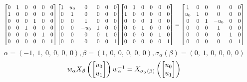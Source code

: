 \documentclass[11pt]{article}
\theoremstyle{definition}
\begin{document}
\[
\scaletoalign{\textwidth}{{\left[\begin{matrix}0 & 1 & 0 & 0 & 0 & 0\\1 & 0 & 0 & 0 & 0 & 0\\0 & 0 & 0 & 1 & 0 & 0\\0 & 0 & 1 & 0 & 0 & 0\\0 & 0 & 0 & 0 & 1 & 0\\0 & 0 & 0 & 0 & 0 & 1\end{matrix}\right]} {\left[\begin{matrix}1 & u_{0} & 0 & 0 & 0 & 0\\0 & 1 & 0 & 0 & 0 & 0\\0 & 0 & 1 & 0 & 0 & 0\\0 & 0 & - u_{0} & 1 & 0 & 0\\0 & 0 & 0 & 0 & 1 & 0\\0 & 0 & 0 & 0 & 0 & 1\end{matrix}\right]} {\left[\begin{matrix}0 & 1 & 0 & 0 & 0 & 0\\1 & 0 & 0 & 0 & 0 & 0\\0 & 0 & 0 & 1 & 0 & 0\\0 & 0 & 1 & 0 & 0 & 0\\0 & 0 & 0 & 0 & 1 & 0\\0 & 0 & 0 & 0 & 0 & 1\end{matrix}\right]} = {\left[\begin{matrix}1 & 0 & 0 & 0 & 0 & 0\\u_{0} & 1 & 0 & 0 & 0 & 0\\0 & 0 & 1 & - u_{0} & 0 & 0\\0 & 0 & 0 & 1 & 0 & 0\\0 & 0 & 0 & 0 & 1 & 0\\0 & 0 & 0 & 0 & 0 & 1\end{matrix}\right]}}
\]
\[
\alpha = \left( -1, \  1, \  0, \  0, \  0, \  0\right), \beta = \left( 1, \  0, \  0, \  0, \  0, \  0\right), \sigma_{\alpha}(\beta) = \left( 0, \  1, \  0, \  0, \  0, \  0\right)
\]
\[
\scaletoalign{\textwidth}{w_{\alpha} X_{\beta}\left(\left[\begin{matrix}u_{0}\\u_{1}\end{matrix}\right]\right) w_{\alpha}^{-1} = X_{\sigma_{\alpha}\left(\beta\right)}\left(\left[\begin{matrix}u_{0}\\u_{1}\end{matrix}\right]\right)}
\]
\end{document}
